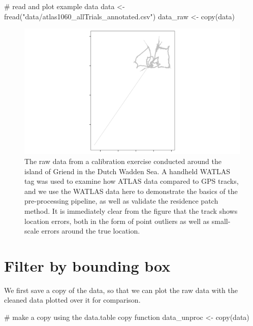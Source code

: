 \documentclass[]{scrreprt}
\newenvironment{Shaded}{}{}
\newcommand{\CommentTok}[1]{\textcolor[rgb]{0.00,0.50,0.00}{#1}}
\newcommand{\KeywordTok}[1]{\textcolor[rgb]{0.00,0.00,1.00}{#1}}
\newcommand{\NormalTok}[1]{#1}
\newcommand{\StringTok}[1]{\textcolor[rgb]{0.00,0.50,0.50}{#1}}
\begin{document}
\begin{Shaded}
\begin{Highlighting}[]
\CommentTok{# read and plot example data}
\NormalTok{data <-}\StringTok{ }\KeywordTok{fread}\NormalTok{(}\StringTok{"data/atlas1060_allTrials_annotated.csv"}\NormalTok{)}
\NormalTok{data_raw <-}\StringTok{ }\KeywordTok{copy}\NormalTok{(data)}
\end{Highlighting}
\end{Shaded}

\begin{figure}
\centering
\includegraphics{figures/fig_calibration_raw.png}
\caption{The raw data from a calibration exercise conducted around the island of Griend in the Dutch Wadden Sea. A handheld WATLAS tag was used to examine how ATLAS data compared to GPS tracks, and we use the WATLAS data here to demonstrate the basics of the pre-processing pipeline, as well as validate the residence patch method. It is immediately clear from the figure that the track shows location errors, both in the form of point outliers as well as small-scale errors around the true location.}
\end{figure}

\hypertarget{filter-by-bounding-box}{%
\section{Filter by bounding box}\label{filter-by-bounding-box}}

We first save a copy of the data, so that we can plot the raw data with the cleaned data plotted over it for comparison.

\begin{Shaded}
\begin{Highlighting}[]
\CommentTok{# make a copy using the data.table copy function}
\NormalTok{data_unproc <-}\StringTok{ }\KeywordTok{copy}\NormalTok{(data)}
\end{Highlighting}
\end{Shaded}
\end{document}
